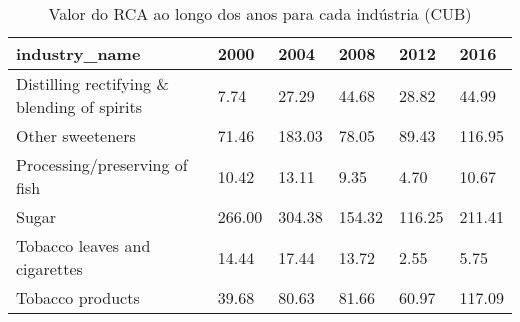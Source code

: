 \begin{table}
\centering
\caption{Valor do RCA ao longo dos anos para cada indústria (CUB)}
\begin{tabular}{p{6cm}p{1.5cm}p{1.5cm}p{1.5cm}p{1.5cm}p{1.5cm}}
\toprule
                              industry\_name &   2000 &   2004 &   2008 &   2012 &   2016 \\
\midrule
Distilling rectifying \& blending of spirits &   7.74 &  27.29 &  44.68 &  28.82 &  44.99 \\
                           Other sweeteners &  71.46 & 183.03 &  78.05 &  89.43 & 116.95 \\
              Processing/preserving of fish &  10.42 &  13.11 &   9.35 &   4.70 &  10.67 \\
                                      Sugar & 266.00 & 304.38 & 154.32 & 116.25 & 211.41 \\
              Tobacco leaves and cigarettes &  14.44 &  17.44 &  13.72 &   2.55 &   5.75 \\
                           Tobacco products &  39.68 &  80.63 &  81.66 &  60.97 & 117.09 \\
\bottomrule
\end{tabular}
\end{table}
